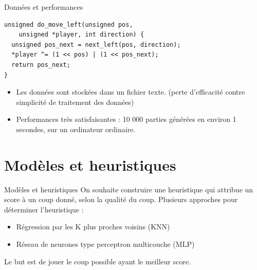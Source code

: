 \documentclass{beamer}
\begin{document}
\begin{frame}[fragile]{Données et performances}
    \begin{verbatim}
unsigned do_move_left(unsigned pos,
    unsigned *player, int direction) {
  unsigned pos_next = next_left(pos, direction);
  *player ^= (1 << pos) | (1 << pos_next);
  return pos_next;
}
    \end{verbatim}
    \begin{itemize}
        \item Les données sont stockées dans un fichier texte. \newline
              (perte d'efficacité contre simplicité de traitement des données)
        \item Performances très satisfaisantes : \newline
              \alert{10 000} parties générées en environ \alert{1 secondes}, sur un ordinateur ordinaire.
    \end{itemize}
\end{frame}

{\section{Modèles et heuristiques}}

\begin{frame}{Modèles et heuristiques}
    On souhaite construire une heuristique qui attribue un \alert{score} à un coup donné, selon la \alert{qualité} du coup.
    Plusieurs approches pour déterminer l'heuristique :
    \begin{itemize}
        \item Régression par les K plus proches voisins (KNN)
        \item Réseau de neurones type perceptron multicouche (MLP)
    \end{itemize}
    Le but est de jouer le coup possible ayant le meilleur score.
\end{frame}
\end{document}
